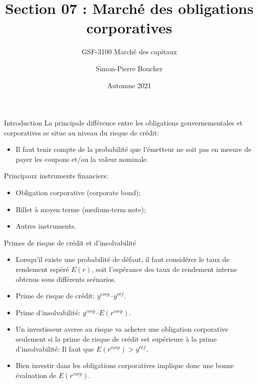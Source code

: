 \documentclass{beamer}
\title[S07  Marché des obligations corporatives]{Section 07 : Marché des obligations corporatives}
\subtitle{GSF-3100 Marché des capitaux}
\author[SP. Boucher]{Simon-Pierre Boucher\inst{1}}
\institute[Université Laval]
{
  \inst{1}%
  Département de finance, assurance et immobilier\\
  Faculté des sciences de l'administration\\
  Université Laval}
\date[Automne 2021]{Automne 2021}
\begin{document}
\begin{frame}
\titlepage
\end{frame}

\begin{frame}{Introduction}
La principale différence entre les obligations gouvernementales et corporatives se situe au niveau du risque de crédit: 
\begin{itemize}
\item Il faut tenir compte de la probabilité que l’émetteur ne soit pas en mesure de payer les coupons et/ou la valeur nominale.
\end{itemize}
Principaux instruments financiers:
\begin{itemize}
\item Obligation corporative (corporate bond);
\item Billet à moyen terme (medium-term note); 
\item Autres instruments.
\end{itemize}
\end{frame}


\begin{frame}{Primes de risque de crédit et d’insolvabilité}
\begin{itemize}
\item Lorsqu’il existe une probabilité de défaut, il faut considérer le taux de rendement espéré $E(r)$, soit l’espérance des taux de rendement interne obtenus sous différents scénarios.
\item Prime de risque de crédit: $y^{corp} – y^{réf}$.
\item Prime d’insolvabilité: $y^{corp} – E(r^{corp})$.
\item Un investisseur averse au risque va acheter une obligation corporative seulement si la prime de risque de crédit est supérieure à la prime d’insolvabilité: Il faut que $E(r^{corp}) > y^{réf}$.
\item Bien investir dans les obligations corporatives implique donc une bonne évaluation de $E(r^{corp})$.
\end{itemize}
\end{frame}
\end{document}
